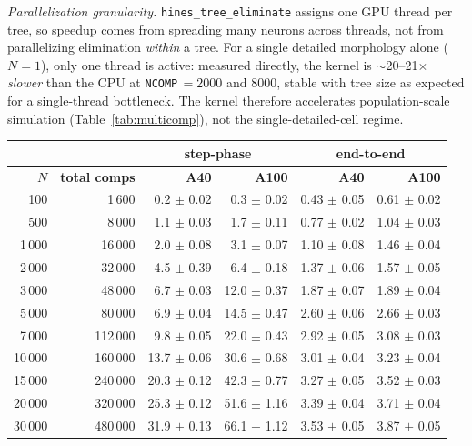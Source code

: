 \documentclass[preprint,12pt, a4paper]{elsarticle}
\newcommand{\hte}{\texttt{hines\_\allowbreak tree\_\allowbreak eliminate}}
\begin{document}
\begin{enumerate}
\emph{Parallelization granularity.} \hte{} assigns one GPU thread per tree, so speedup comes from spreading many neurons across threads, not from parallelizing elimination \emph{within} a tree. For a single detailed morphology alone ($N=1$), only one thread is active: measured directly, the kernel is $\sim$20--21$\times$ \emph{slower} than the CPU at \texttt{NCOMP}\,$=2000$ and $8000$, stable with tree size as expected for a single-thread bottleneck. The kernel therefore accelerates population-scale simulation (Table~\ref{tab:multicomp}), not the single-detailed-cell regime.

\begin{table}[!h]
\centering
\small
\begin{tabular}{|r|r|r|r|r|r|}
\hline
& & \multicolumn{2}{c|}{\textbf{step-phase}} & \multicolumn{2}{c|}{\textbf{end-to-end}} \\
\hline
\textbf{$N$} & \textbf{total comps} & \textbf{A40} & \textbf{A100} & \textbf{A40} & \textbf{A100} \\
\hline
100     & 1\,600   & 0.2 $\pm$ 0.02 & 0.3 $\pm$ 0.02 & 0.43 $\pm$ 0.05 & 0.61 $\pm$ 0.02 \\
\hline
500     & 8\,000   & 1.1 $\pm$ 0.03 & 1.7 $\pm$ 0.11 & 0.77 $\pm$ 0.02 & 1.04 $\pm$ 0.03 \\
\hline
1\,000  & 16\,000  & 2.0 $\pm$ 0.08 & 3.1 $\pm$ 0.07 & 1.10 $\pm$ 0.08 & 1.46 $\pm$ 0.04 \\
\hline
2\,000  & 32\,000  & 4.5 $\pm$ 0.39 & 6.4 $\pm$ 0.18 & 1.37 $\pm$ 0.06 & 1.57 $\pm$ 0.05 \\
\hline
3\,000  & 48\,000  & 6.7 $\pm$ 0.03 & 12.0 $\pm$ 0.37 & 1.87 $\pm$ 0.07 & 1.89 $\pm$ 0.04 \\
\hline
5\,000  & 80\,000  & 6.9 $\pm$ 0.04 & 14.5 $\pm$ 0.47 & 2.60 $\pm$ 0.06 & 2.66 $\pm$ 0.03 \\
\hline
7\,000  & 112\,000 & 9.8 $\pm$ 0.05 & 22.0 $\pm$ 0.43 & 2.92 $\pm$ 0.05 & 3.08 $\pm$ 0.03 \\
\hline
10\,000 & 160\,000 & 13.7 $\pm$ 0.06 & 30.6 $\pm$ 0.68 & 3.01 $\pm$ 0.04 & 3.23 $\pm$ 0.04 \\
\hline
15\,000 & 240\,000 & 20.3 $\pm$ 0.12 & 42.3 $\pm$ 0.77 & 3.27 $\pm$ 0.05 & 3.52 $\pm$ 0.03 \\
\hline
20\,000 & 320\,000 & 25.3 $\pm$ 0.12 & 51.6 $\pm$ 1.16 & 3.39 $\pm$ 0.04 & 3.71 $\pm$ 0.04 \\
\hline
30\,000 & 480\,000 & 31.9 $\pm$ 0.13 & 66.1 $\pm$ 1.12 & 3.53 $\pm$ 0.05 & 3.87 $\pm$ 0.05 \\
\hline

\end{tabular}
\end{table}
\end{enumerate}
\end{document}
